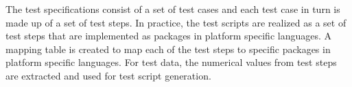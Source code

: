 The test specifications consist of a set of test cases and each test case in turn is made up of a set of test steps. In practice, the test scripts are realized as a set of test steps that are implemented as packages in platform specific languages. A mapping table is created to map each of the test steps to specific packages in platform specific languages. For test data, the numerical values from test steps are extracted and used for test script generation.





